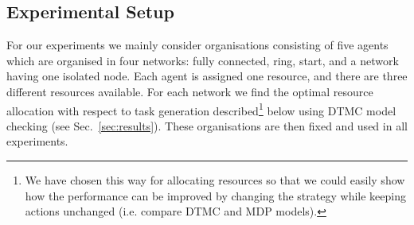 \documentclass{llncs}
\begin{document}
\subsection{Experimental Setup}
\label{subsec:exp_set}
For our experiments we mainly consider organisations consisting of five agents which are organised in four networks: fully connected, ring, start, and a network having one isolated node. Each agent is assigned one resource, and there are three different resources available. For each network we find the optimal resource allocation with respect to task generation described\footnote{We have chosen this way for allocating resources so that we could easily show how the performance can be improved by changing the strategy while keeping actions unchanged (i.e. compare DTMC and MDP models).} below using DTMC model checking (see Sec.~\ref{sec:results}). These organisations are then fixed and used in all experiments.
\end{document}

